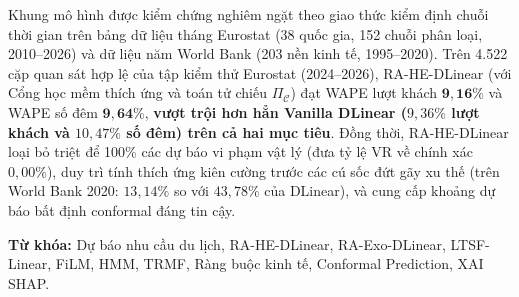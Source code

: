Khung mô hình được kiểm chứng nghiêm ngặt theo giao thức kiểm định chuỗi thời gian trên bảng dữ liệu tháng Eurostat (38 quốc gia, 152 chuỗi phân loại, 2010--2026) và dữ liệu năm World Bank (203 nền kinh tế, 1995--2020). Trên 4.522 cặp quan sát hợp lệ của tập kiểm thử Eurostat (2024--2026), RA-HE-DLinear (với Cổng học mềm thích ứng và toán tử chiếu $\Pi_{\mathcal{C}}$) đạt WAPE lượt khách $\mathbf{9{,}16\%}$ và WAPE số đêm $\mathbf{9{,}64\%}$, \textbf{vượt trội hơn hẳn Vanilla DLinear ($9{,}36\%$ lượt khách và $10{,}47\%$ số đêm) trên cả hai mục tiêu}. Đồng thời, RA-HE-DLinear loại bỏ triệt để 100\% các dự báo vi phạm vật lý (đưa tỷ lệ VR về chính xác $0{,}00\%$), duy trì tính thích ứng kiên cường trước các cú sốc đứt gãy xu thế (trên World Bank 2020: $13{,}14\%$ so với $43{,}78\%$ của DLinear), và cung cấp khoảng dự báo bất định conformal đáng tin cậy.

\vspace{0.5cm}
\noindent \textbf{Từ khóa:} Dự báo nhu cầu du lịch, RA-HE-DLinear, RA-Exo-DLinear, LTSF-Linear, FiLM, HMM, TRMF, Ràng buộc kinh tế, Conformal Prediction, XAI SHAP.

